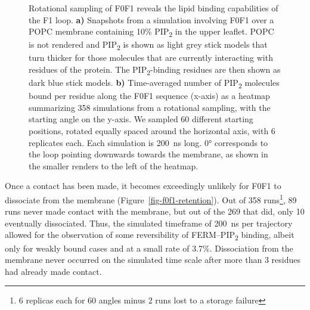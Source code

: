 \documentclass[
  twocolumn]{biophys-new-mod}
\begin{document}
\begin{figure}
\begin{minipage}[t]{\linewidth}
{{}

}

\subcaption{\label{fig-f0f1-ri-angle}~}
\end{minipage}%

\caption{\label{fig-loop-importance}Rotational sampling of F0F1 reveals
the lipid binding capabilities of the F1 loop. \textbf{a)} Snapshots
from a simulation involving F0F1 over a POPC membrane containing 10\%
PIP\textsubscript{2} in the upper leaflet. POPC is not rendered and
PIP\textsubscript{2} is shown as light grey stick models that turn
thicker for those molecules that are currently interacting with residues
of the protein. The PIP\textsubscript{2}-binding residues are then shown
as dark blue stick models. \textbf{b)} Time-averaged number of
PIP\textsubscript{2} molecules bound per residue along the F0F1 sequence
(x-axis) as a heatmap summarizing 358 simulations from a rotational
sampling, with the starting angle on the y-axis. We sampled 60 different
starting positions, rotated equally spaced around the horizontal axis,
with 6 replicates each. Each simulation is 200~ns long. 0° corresponds
to the loop pointing downwards towards the membrane, as shown in the
smaller renders to the left of the heatmap.}

\end{figure}

Once a contact has been made, it becomes exceedingly unlikely for F0F1
to dissociate from the membrane (Figure~\ref{fig-f0f1-retention}). Out
of 358 runs\footnote{6 replicas each for 60 angles minus 2 runs lost to
  a storage failure}, 89 runs never made contact with the membrane, but
out of the 269 that did, only 10 eventually dissociated. Thus, the
simulated timeframe of 200~ns per trajectory allowed for the observation
of some reversibility of FERM--PIP\textsubscript{2} binding, albeit only
for weakly bound cases and at a small rate of 3.7\%. Dissociation from
the membrane never occurred on the simulated time scale after more than
3 residues had already made contact.
\end{document}
